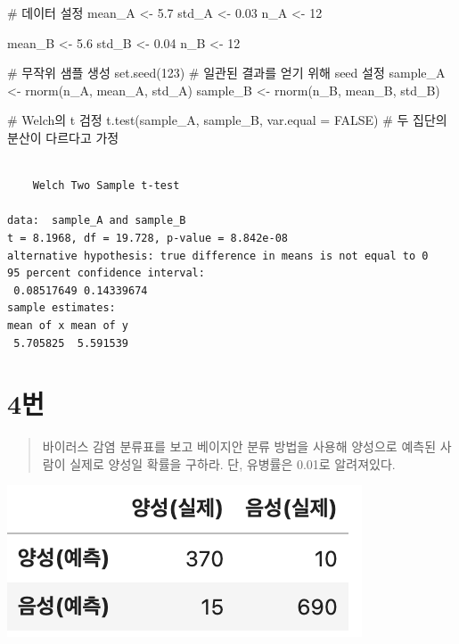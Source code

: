 \documentclass[
  letterpaper,
  DIV=11,
  numbers=noendperiod]{scrreprt}
\newenvironment{Shaded}{\begin{snugshade}}{\end{snugshade}}
\newcommand{\AttributeTok}[1]{\textcolor[rgb]{0.40,0.45,0.13}{#1}}
\newcommand{\CommentTok}[1]{\textcolor[rgb]{0.37,0.37,0.37}{#1}}
\newcommand{\ConstantTok}[1]{\textcolor[rgb]{0.56,0.35,0.01}{#1}}
\newcommand{\DecValTok}[1]{\textcolor[rgb]{0.68,0.00,0.00}{#1}}
\newcommand{\FloatTok}[1]{\textcolor[rgb]{0.68,0.00,0.00}{#1}}
\newcommand{\FunctionTok}[1]{\textcolor[rgb]{0.28,0.35,0.67}{#1}}
\newcommand{\NormalTok}[1]{\textcolor[rgb]{0.00,0.23,0.31}{#1}}
\newcommand{\OtherTok}[1]{\textcolor[rgb]{0.00,0.23,0.31}{#1}}
\begin{document}
\begin{Shaded}
\begin{Highlighting}[]
\CommentTok{\# 데이터 설정}
\NormalTok{mean\_A }\OtherTok{\textless{}{-}} \FloatTok{5.7}
\NormalTok{std\_A }\OtherTok{\textless{}{-}} \FloatTok{0.03}
\NormalTok{n\_A }\OtherTok{\textless{}{-}} \DecValTok{12}

\NormalTok{mean\_B }\OtherTok{\textless{}{-}} \FloatTok{5.6}
\NormalTok{std\_B }\OtherTok{\textless{}{-}} \FloatTok{0.04}
\NormalTok{n\_B }\OtherTok{\textless{}{-}} \DecValTok{12}

\CommentTok{\# 무작위 샘플 생성}
\FunctionTok{set.seed}\NormalTok{(}\DecValTok{123}\NormalTok{)  }\CommentTok{\# 일관된 결과를 얻기 위해 seed 설정}
\NormalTok{sample\_A }\OtherTok{\textless{}{-}} \FunctionTok{rnorm}\NormalTok{(n\_A, mean\_A, std\_A)}
\NormalTok{sample\_B }\OtherTok{\textless{}{-}} \FunctionTok{rnorm}\NormalTok{(n\_B, mean\_B, std\_B)}

\CommentTok{\# Welch의 t 검정}
\FunctionTok{t.test}\NormalTok{(sample\_A, sample\_B, }\AttributeTok{var.equal =} \ConstantTok{FALSE}\NormalTok{)  }\CommentTok{\# 두 집단의 분산이 다르다고 가정}
\end{Highlighting}
\end{Shaded}

\begin{verbatim}

    Welch Two Sample t-test

data:  sample_A and sample_B
t = 8.1968, df = 19.728, p-value = 8.842e-08
alternative hypothesis: true difference in means is not equal to 0
95 percent confidence interval:
 0.08517649 0.14339674
sample estimates:
mean of x mean of y 
 5.705825  5.591539 
\end{verbatim}

\hypertarget{uxbc88-73}{%
\chapter*{4번}\label{uxbc88-73}}


\begin{quote}
바이러스 감염 분류표를 보고 베이지안 분류 방법을 사용해 양성으로 예측된
사람이 실제로 양성일 확률을 구하라. 단, 유병률은 0.01로 알려져있다.
\end{quote}

\includegraphics{./test/24/problem4.png}
\end{document}
